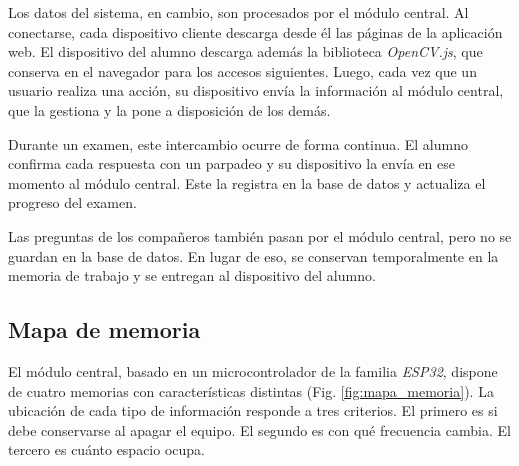 Los datos del sistema, en cambio, son procesados por el módulo central. Al conectarse, cada dispositivo cliente descarga desde él las páginas de la aplicación web. El dispositivo del alumno descarga además la biblioteca \emph{OpenCV.js}, que conserva en el navegador para los accesos siguientes. Luego, cada vez que un usuario realiza una acción, su dispositivo envía la información al módulo central, que la gestiona y la pone a disposición de los demás.

Durante un examen, este intercambio ocurre de forma continua. El alumno confirma cada respuesta con un parpadeo y su dispositivo la envía en ese momento al módulo central. Este la registra en la base de datos y actualiza el progreso del examen.

Las preguntas de los compañeros también pasan por el módulo central, pero no se guardan en la base de datos. En lugar de eso, se conservan temporalmente en la memoria de trabajo y se entregan al dispositivo del alumno.

\subsection{Mapa de memoria}
\label{sec:mapa_memoria}


El módulo central, basado en un microcontrolador de la familia \emph{ESP32}, dispone de cuatro memorias con características distintas (Fig. \ref{fig:mapa_memoria}). La ubicación de cada tipo de información responde a tres criterios. El primero es si debe conservarse al apagar el equipo. El segundo es con qué frecuencia cambia. El tercero es cuánto espacio ocupa.


